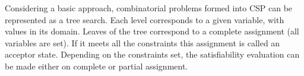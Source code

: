 
Considering a basic approach, combinatorial problems formed into CSP can be represented as a tree search. Each level corresponds to a given variable, with values in its domain. Leaves of the tree correspond to a complete assignment (all variables are set). If it meets all the constraints this assignment is called an acceptor state. Depending on the constraints set, the satisfiability evaluation can be made either on complete or partial assignment.
%
%
%
%         
%         
